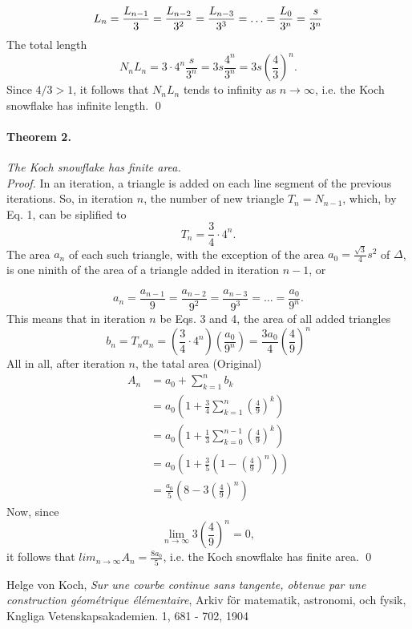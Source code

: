 \documentclass[a4paper]{article}
\begin{document}
\begin{equation}
	L_n = \frac {L_{n-1}} {3} = \frac {L_{n - 2}} {3^2} = \frac {L_{n - 3}} {3^3} = \ldots = 
		\frac{L_0} {3^n} = \frac s {3^n}
\end{equation}
The total length
$$
	N_nL_n = 3 \cdot 4^n \frac s {3^n} = 3s \frac {4^n} {3^n} = 3s \left (
		\frac 4 3
	\right )^n.
$$
Since $4 / 3 > 1$, it follows that $N_nL_n$ tends to infinity as
$n \to \infty$, i.e. the Koch snowflake has infinite length. 
\hfill \qed
\paragraph{Theorem 2.} \emph{The Koch snowflake has finite area.}\\
\emph{Proof.} In an iteration, a triangle is added on each line segment of the
previous iterations. So, in iteration $n$, the number of new triangle
$T_n = N_{n-1}$, which, by Eq. 1, can be siplified to
\begin{equation}
	T_n = \frac 3 4 \cdot 4^n.
\end{equation}
The area $a_n$ of each such triangle, with the exception of the area
$a_0 = \frac {\sqrt 3} 4 s^2$ of $\Delta$, is one ninith of the area of a 
triangle added in iteration $n - 1$, or

\begin{equation}
	a_n = \frac {a_{n-1}} {9}
		= \frac {a_{n-2}} {9^2}
		= \frac {a_{n-3}} {9^3}
		= \ldots
		= \frac {a_0} {9^n}.
\end{equation}
This means that in iteration $n$ be Eqs. 3 and 4, the area of all added
triangles
$$
	b_n = T_na_n = \left (
		\frac 3 4 \cdot 4^n
	\right )
	\left (
		\frac {a_0} {9^n}
	\right ) = \frac {3a_0} 4 \left (
	\frac 4 9
	\right )^n
$$
All in all, after iteration $n$, the tatal area \hfill (Original)
\newcommand{\ubersum}[2] {
	\sum_{k=#2}^{n#1}
}
\begin{align*}
	A_n &= a_0 + \ubersum{}{1} b_k \\
		&= a_0 \left (
				1 + \frac 3 4 \ubersum{}{1}\left(\frac 4 9 \right )^k
			\right ) \\
		&= a_0 \left (
				1 + \frac 1 3 \ubersum{-1}{0}\left(\frac 4 9 \right )^k
			\right ) \\
		&= a_0 \left (
				1 + \frac 3 5 \left ( 1 - \left( \frac 4 9 \right )^n \right )
			\right ) \\
		&= \frac {a_0} 5 \left (
				8 - 3 \left ( \frac 4 9 \right )^n
			\right )
\end{align*}
Now, since
$$
	\lim_{n \to \infty} 3 \left ( \frac 4 9 \right )^n = 0,
$$
it follows that $lim_{n \to \infty} A_n = \frac {8a_0} 5$, i.e. the Koch 
snowflake has finite area. \hfill \qed

{}

\begin{thebibliography}{9}
		Helge von Koch,
		\emph{Sur une courbe continue sans tangente, obtenue par une
		construction géométrique élémentaire},
		Arkiv för matematik, astronomi, och fysik, Kngliga Vetenskapsakademien.
		1,
		681 - 702,
		1904
\end{thebibliography}
\end{document}
